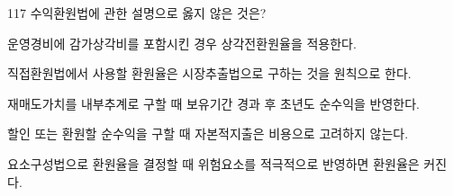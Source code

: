 \begin{question}{117}
수익환원법에 관한 설명으로 옳지 않은 것은?
\begin{choices}
  \item 운영경비에 감가상각비를 포함시킨 경우 상각전환원율을 적용한다.
  \item 직접환원법에서 사용할 환원율은 시장추출법으로 구하는 것을 원칙으로 한다.
  \item 재매도가치를 내부추계로 구할 때 보유기간 경과 후 초년도 순수익을 반영한다.
  \item 할인 또는 환원할 순수익을 구할 때 자본적지출은 비용으로 고려하지 않는다.
  \item 요소구성법으로 환원율을 결정할 때 위험요소를 적극적으로 반영하면 환원율은 커진다.
\end{choices}
\end{question}
